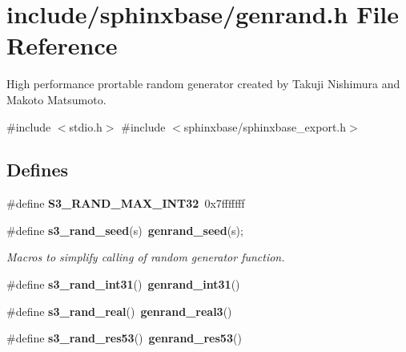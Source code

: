 \section{include/sphinxbase/genrand.h \-File \-Reference}
\label{genrand_8h}


\-High performance prortable random generator created by \-Takuji \-Nishimura and \-Makoto \-Matsumoto.  


{\ttfamily \#include $<$stdio.\-h$>$}\*
{\ttfamily \#include $<$sphinxbase/sphinxbase\-\_\-export.\-h$>$}\*
\subsection*{\-Defines}
\begin{DoxyCompactItemize}
\item 
\#define {\bfseries \-S3\-\_\-\-R\-A\-N\-D\-\_\-\-M\-A\-X\-\_\-\-I\-N\-T32}~0x7fffffff\label{genrand_8h_a29d6253e4a57e7c4d56cf7f6155b4007}

\item 
\#define {\bf s3\-\_\-rand\-\_\-seed}(s)~{\bf genrand\-\_\-seed}(s);\label{genrand_8h_a88ed88daecb88e115d8559c1b0a09bb7}

\begin{DoxyCompactList}\small\item\em \-Macros to simplify calling of random generator function. \end{DoxyCompactList}\item 
\#define {\bfseries s3\-\_\-rand\-\_\-int31}()~{\bf genrand\-\_\-int31}()\label{genrand_8h_a3dcc058023a95c0a0ca1f12d1fdec9b9}

\item 
\#define {\bfseries s3\-\_\-rand\-\_\-real}()~{\bf genrand\-\_\-real3}()\label{genrand_8h_a85a5844eace98dcbb4742d408a75d5e7}

\item 
\#define {\bfseries s3\-\_\-rand\-\_\-res53}()~{\bf genrand\-\_\-res53}()\label{genrand_8h_a226b9a1deec002aeb1f1775b830a3062}

\end{DoxyCompactItemize}
